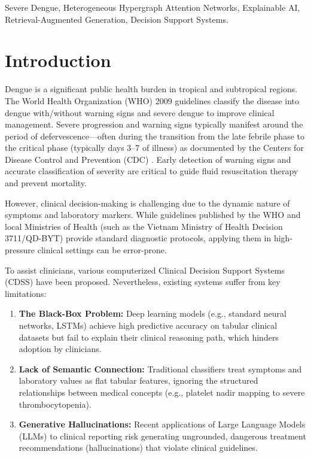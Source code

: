 \documentclass[conference]{IEEEtran}
\begin{document}
\begin{IEEEkeywords}
Severe Dengue, Heterogeneous Hypergraph Attention Networks, Explainable AI, Retrieval-Augmented Generation, Decision Support Systems.
\end{IEEEkeywords}

\section{Introduction}
\label{sec:intro}
Dengue is a significant public health burden in tropical and subtropical regions. The World Health Organization (WHO) 2009 guidelines classify the disease into dengue with/without warning signs and severe dengue to improve clinical management. Severe progression and warning signs typically manifest around the period of defervescence—often during the transition from the late febrile phase to the critical phase (typically days 3–7 of illness) as documented by the Centers for Disease Control and Prevention (CDC) \cite{who2009}. Early detection of warning signs and accurate classification of severity are critical to guide fluid resuscitation therapy and prevent mortality.

However, clinical decision-making is challenging due to the dynamic nature of symptoms and laboratory markers. While guidelines published by the WHO and local Ministries of Health (such as the Vietnam Ministry of Health Decision 3711/QD-BYT) provide standard diagnostic protocols, applying them in high-pressure clinical settings can be error-prone. 

To assist clinicians, various computerized Clinical Decision Support Systems (CDSS) have been proposed. Nevertheless, existing systems suffer from key limitations:
\begin{enumerate}
    \item \textbf{The Black-Box Problem:} Deep learning models (e.g., standard neural networks, LSTMs) achieve high predictive accuracy on tabular clinical datasets but fail to explain their clinical reasoning path, which hinders adoption by clinicians.
    \item \textbf{Lack of Semantic Connection:} Traditional classifiers treat symptoms and laboratory values as flat tabular features, ignoring the structured relationships between medical concepts (e.g., platelet nadir mapping to severe thrombocytopenia).
    \item \textbf{Generative Hallucinations:} Recent applications of Large Language Models (LLMs) to clinical reporting risk generating ungrounded, dangerous treatment recommendations (hallucinations) that violate clinical guidelines.
\end{enumerate}
\end{document}
